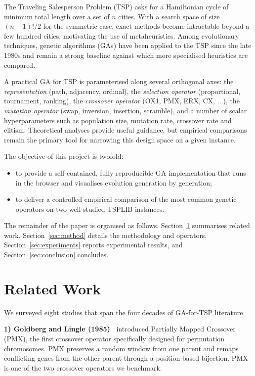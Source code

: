 \documentclass[conference]{IEEEtran}
\begin{document}
The Traveling Salesperson Problem (TSP) asks for a Hamiltonian cycle of
minimum total length over a set of $n$ cities. With a search space of size
$(n-1)!/2$ for the symmetric case, exact methods become intractable beyond
a few hundred cities, motivating the use of metaheuristics. Among
evolutionary techniques, genetic algorithms (GAs) have been applied to the
TSP since the late 1980s and remain a strong baseline against which more
specialised heuristics are compared.

A practical GA for TSP is parameterised along several orthogonal axes: the
\emph{representation} (path, adjacency, ordinal), the \emph{selection
operator} (proportional, tournament, ranking), the \emph{crossover operator}
(OX1, PMX, ERX, CX, $\dots$), the \emph{mutation operator} (swap, inversion,
insertion, scramble), and a number of scalar hyperparameters such as
population size, mutation rate, crossover rate and elitism. Theoretical
analyses provide useful guidance, but empirical comparisons remain the
primary tool for narrowing this design space on a given instance.

The objective of this project is twofold:
\begin{itemize}
\item to provide a self-contained, fully reproducible GA implementation
that runs in the browser and visualises evolution generation by generation;
\item to deliver a controlled empirical comparison of the most common
genetic operators on two well-studied TSPLIB instances.
\end{itemize}

The remainder of the paper is organised as follows. Section~\ref{sec:related}
summarises related work. Section~\ref{sec:method} details the methodology
and operators. Section~\ref{sec:experiments} reports experimental results,
and Section~\ref{sec:conclusion} concludes.

\section{Related Work}\label{sec:related}

We surveyed eight studies that span the four decades of GA-for-TSP
literature.

\textbf{1) Goldberg and Lingle (1985)~\cite{goldberg1985}} introduced
Partially Mapped Crossover (PMX), the first crossover operator specifically
designed for permutation chromosomes. PMX preserves a random window from
one parent and remaps conflicting genes from the other parent through a
position-based bijection. PMX is one of the two crossover operators we
benchmark.
\end{document}
